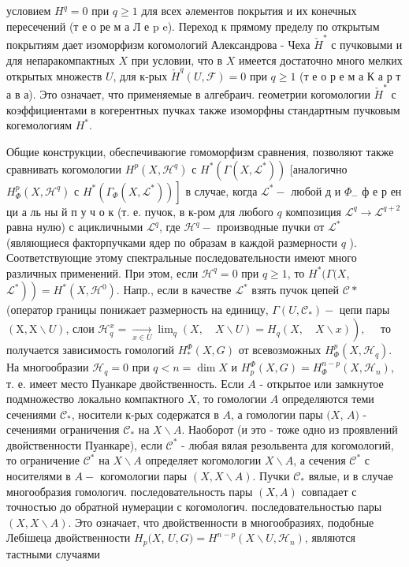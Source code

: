 \documentclass[10pt]{article}
\begin{document}
условием $H^{q}=0$ при $q \geqslant 1$ для всех әлементов покрытия и их конечных пересечений (т е о ре м а Л е p e). Переход к прямому пределу по открытым покрытиям дает изоморфизм когомологий Александрова - Чеха $\check{H}^{*}$ с пучковыми и для непаракомпактных $X$ при условии, что в $X$ имеется достаточно много мелких открытых множеств $U$, для к-рых $\check{H}^{q}(U, \mathscr{F})=0$ при $q \geqslant 1$ (т е о р е м а К а р т а в а). Это означает, что применяемые в алгебраич. геометрии когомологии $\check{H}^{*}$ с коэффициентами в когерентных пучках также изоморфны стандартным пучковым когемологиям $H^{*}$.



Общие конструкции, обеспечиваюгие гомоморфизм сравнения, позволяют также сравнивать когомологии $H^{p}\left(X, \mathscr{H}^{q}\right)$ с $H^{*}\left(\Gamma\left(X, \mathscr{L}^{*}\right)\right)$ [аналогично $H_{\Phi}^{p}\left(X, \mathscr{H}^{q}\right)$ с $\left.H^{*}\left(\Gamma_{\Phi}\left(X, \mathscr{L}^{*}\right)\right)\right]$ в случае, когда $\mathscr{L}^{*}-$ любой д и $\Phi_{-}$ ф е р ен ци а ль ны й п у ч о к (т. е. пучок, в к-ром для любого $q$ композиция $\mathscr{L}^{q} \rightarrow \mathscr{L}^{q+2}$ равна нулю) с ацикличными $\mathscr{L}^{q}$, где $\mathscr{H}^{q}-$ производные пучки от $\mathscr{L}^{*}$ (являющиеся факторпучками ядер по образам в каждой размерности $q$ ). Соответствующие этому спектральные последовательности имеют много различных применений. При этом, если $\mathscr{H}^{q}=0$ при $q \geqslant 1$, то $H^{*}(\Gamma(X$, $\left.\left.\mathscr{L}^{*}\right)\right)=H^{*}\left(X, \mathscr{H}^{0}\right)$. Напр., если в качестве $\mathscr{L}^{*}$ взять пучок цепей $\mathscr{C} *$ (оператор границы понижает размерность на единицу, $\Gamma\left(U, \mathscr{C}_{*}\right)-$ цепи пары $(\mathrm{X}, \mathrm{X} \backslash U)$, слои $\left.\mathscr{H}_{q}^{x}=\underset{x \in U}{\longrightarrow} \lim _{q}(X, \quad X \backslash U)=H_{q}(X, \quad X \backslash x)\right), \quad$ то получается зависимость гомологий $H_{*}^{\Phi}(X, G)$ от всевозможных $H_{\Phi}^{p}\left(X, \mathscr{H}_{q}\right)$. На многообразии $\mathscr{H}_{q}=0$ при $q<n=\operatorname{dim} X$ и $H_{p}^{\Phi}(X, G)=H_{\Phi}^{n-p}\left(X, \mathscr{H}_{n}\right)$, т. е. имеет место Пуанкаре двойственность. Если $A$ - открытое или замкнутое подмножество локально компактного $X$, то гомологии $A$ определяются теми сечениями $\mathscr{C}_{*}$, носители к-рых содержатся в $A$, а гомологии пары $(X$, $A)$ - сечениями ограничения $\mathscr{C}_{*}$ на $X \backslash A$. Наоборот (и это - тоже одно из проявлений двойственности Пуанкаре), если $\mathscr{C}^{*}$ - любая вялая резольвента для когомологий, то ограничение $\mathscr{C}^{*}$ на $X \backslash A$ определяет когомологии $X \backslash A$, а сечения $\mathscr{C}^{*}$ с носителями в $A-$ когомологии пары $(X, X \backslash A)$. Пучки $\mathscr{C}_{*}$ вялые, и в случае многообразия гомологич. последовательность пары $(X, A)$ совпадает с точностью до обратной нумерации с когомологич. последовательностью пары $(X, X \backslash A)$. Это означает, что двойственности в многообразиях, подобные Лебішеца двойственности $H_{p}(X$, $U, G)=H^{n-p}\left(X \backslash U, \mathscr{H}_{n}\right)$, являются тастными случаями 
\end{document}
